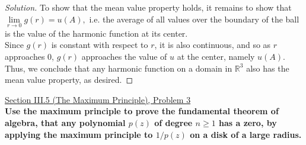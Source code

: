 \documentclass[11pt]{article}
\newenvironment{solution}
  {\renewcommand\qedsymbol{$\blacksquare$}\begin{proof}[Solution]}
  {\end{proof}}
\theoremstyle{definition}
\begin{document}
\begin{solution}
To show that the mean value property holds, it remains to show that $\lim\limits_{r \rightarrow 0} g(r) = u(A),$ i.e. the average of all values over the boundary of the ball is the value of the harmonic function at its center. \\

Since $g(r)$ is constant with respect to $r$, it is also continuous, and so as $r$ approaches $0$, $g(r)$ approaches the value of $u$ at the center, namely $u(A)$. 
Thus, we conclude that any harmonic function on a domain in $\mathbb{R}^3$ also has the mean value property, as desired.
\end{solution}

\newpage

\underline{Section III.5 (The Maximum Principle), Problem 3} \\

\textbf{Use the maximum principle to prove the fundamental theorem of algebra, that any polynomial $p(z)$ of degree $n \geq 1$ has a zero, by applying the maximum principle
to $1/p(z)$ on a disk of a large radius.}
\end{document}
